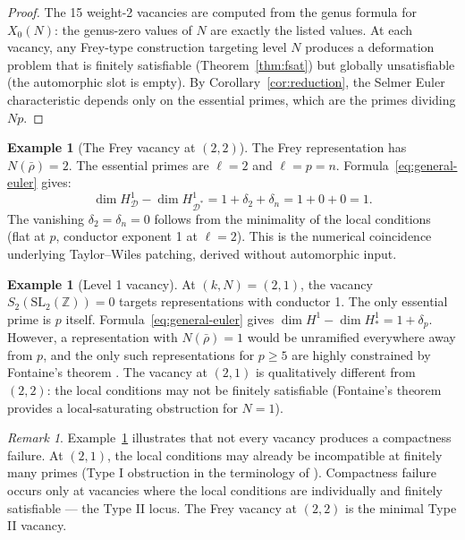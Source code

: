 \documentclass[12pt]{amsart}
\theoremstyle{definition}
\newtheorem{example}[theorem]{Example}
\theoremstyle{remark}
\newtheorem{remark}[theorem]{Remark}
\newcommand{\rhobar}{\bar{\rho}}
\begin{document}
\begin{proof}
The 15 weight-2 vacancies are computed from the genus formula for $X_0(N)$: the genus-zero values of $N$ are exactly the listed values. At each vacancy, any Frey-type construction targeting level $N$ produces a deformation problem that is finitely satisfiable (Theorem~\ref{thm:fsat}) but globally unsatisfiable (the automorphic slot is empty). By Corollary~\ref{cor:reduction}, the Selmer Euler characteristic depends only on the essential primes, which are the primes dividing $Np$.
\end{proof}

\begin{example}[The Frey vacancy at $(2, 2)$]\label{ex:frey}
The Frey representation has $N(\rhobar) = 2$. The essential primes are $\ell = 2$ and $\ell = p = n$. Formula~\eqref{eq:general-euler} gives:
$$\dim H^1_{\mathcal{D}} - \dim H^1_{\mathcal{D}^*} = 1 + \delta_2 + \delta_n = 1 + 0 + 0 = 1.$$
The vanishing $\delta_2 = \delta_n = 0$ follows from the minimality of the local conditions (flat at $p$, conductor exponent 1 at $\ell = 2$). This is the numerical coincidence underlying Taylor--Wiles patching, derived without automorphic input.
\end{example}

\begin{example}[Level 1 vacancy]\label{ex:level1}
At $(k, N) = (2, 1)$, the vacancy $S_2(\mathrm{SL}_2(\mathbb{Z})) = 0$ targets representations with conductor 1. The only essential prime is $p$ itself. Formula~\eqref{eq:general-euler} gives $\dim H^1 - \dim H^1_* = 1 + \delta_p$. However, a representation with $N(\rhobar) = 1$ would be unramified everywhere away from $p$, and the only such representations for $p \geq 5$ are highly constrained by Fontaine's theorem \cite{Fontaine}. The vacancy at $(2, 1)$ is qualitatively different from $(2, 2)$: the local conditions may not be finitely satisfiable (Fontaine's theorem provides a local-saturating obstruction for $N = 1$).
\end{example}

\begin{remark}
Example~\ref{ex:level1} illustrates that not every vacancy produces a compactness failure. At $(2, 1)$, the local conditions may already be incompatible at finitely many primes (Type I obstruction in the terminology of \cite{Author-irreducibility}). Compactness failure occurs only at vacancies where the local conditions are individually and finitely satisfiable --- the Type II locus. The Frey vacancy at $(2, 2)$ is the minimal Type II vacancy.
\end{remark}
\end{document}
